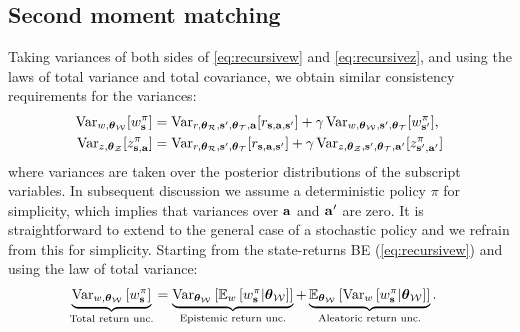 \documentclass{article}
\begin{document}
\subsection*{Second moment matching}

Taking variances of both sides of \cref{eq:recursivew} and \cref{eq:recursivez}, and using the laws of total variance and total covariance, we obtain similar consistency requirements for the variances:
\begin{equation}
\begin{aligned}
\Var_{w, \thetamcw}[\wb] &=  \Var_{r, \thetamcr, \ns, \thetamct, \ac}[\rsanb] + \gamma  \Var_{w, \thetamcw, \ns, \thetamct}[\wnb], \\
\Var_{z, \thetamcz}[\zb] &=  \Var_{r, \thetamcr, \ns, \thetamct}[\rsanb] + \gamma \Var_{z, \thetamcz, \ns, \thetamct, \ac'}[\znb]
\end{aligned}
\end{equation}
where variances are taken over the posterior distributions of the subscript variables. In subsequent discussion we assume a deterministic policy $\pi$ for simplicity, which implies that variances over $\ac$ and $\ac'$ are zero. It is straightforward to extend to the general case of a stochastic policy and we refrain from this for simplicity. Starting from the state-returns BE (\cref{eq:recursivew}) and using the law of total variance:
\begin{align}
\underbrace{\Var_{w, \thetamcw} \sqb{\wb}}_{\text{Total return unc.}} &= \underbrace{\Var_{\thetamcw} \sqb{\E_w\sqb{\wb | \thetamcw}}}_{\text{Epistemic return unc.}} + \underbrace{\E_{\thetamcw} \sqb{\Var_w\sqb{\wb | \thetamcw}}}_{\text{Aleatoric return unc.}}.
\end{align}
\end{document}
